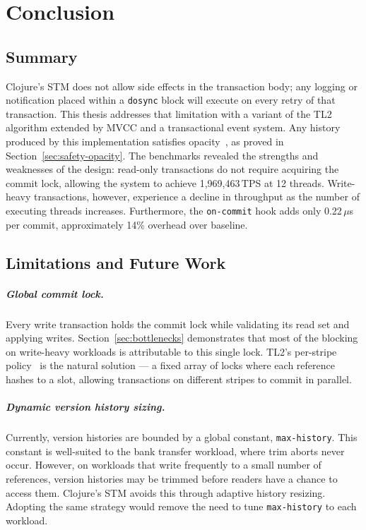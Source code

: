 \chapter{Conclusion}

\section{Summary}

Clojure's STM does not allow side effects in the transaction body; any logging
or notification placed within a \texttt{dosync} block will execute on every retry
of that transaction. This thesis addresses that limitation with
a variant of the TL2 algorithm extended by MVCC and a transactional event system.
Any history produced by this implementation satisfies opacity~\cite{guerraoui2007},
as proved in Section~\ref{sec:safety-opacity}. The benchmarks revealed the strengths
and weaknesses of the design: read-only transactions do not require acquiring
the commit lock, allowing the system to achieve 1{,}969{,}463\,TPS at 12 threads. Write-heavy
transactions, however, experience a decline in throughput as the number of
executing threads increases. Furthermore, the \texttt{on-commit}
hook adds only 0.22\,$\mu$s per commit, approximately 14\% overhead over baseline.

\section{Limitations and Future Work}
\label{sec:future}

\paragraph{Global commit lock.}
Every write transaction holds the commit lock while validating its read set
and applying writes. Section~\ref{sec:bottlenecks} demonstrates that most of
the blocking on write-heavy workloads is attributable to this single lock.
TL2's per-stripe policy~\cite{dice2006transactional} is the natural solution ---
a fixed array of locks where each reference hashes to a slot, allowing transactions
on different stripes to commit in parallel.

\paragraph{Dynamic version history sizing.}
Currently, version histories are bounded by a global constant, \texttt{max-history}.
This constant is well-suited to the bank transfer workload, where trim aborts never occur.
However, on workloads that write frequently to a small number of references, version
histories may be trimmed before readers have a chance to access them.
Clojure's STM avoids this through adaptive history resizing. Adopting the same
strategy would remove the need to tune \texttt{max-history} to each workload.

